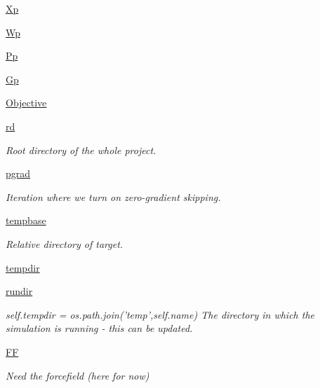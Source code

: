 \begin{DoxyCompactItemize}
\hyperlink{classforcebalance_1_1lipid_1_1Lipid_a56ebab6f8e310afff1b15786ac819eec}{Xp}
\item 
\hyperlink{classforcebalance_1_1lipid_1_1Lipid_aede087654d9ef2447e82692e1b2c65db}{Wp}
\item 
\hyperlink{classforcebalance_1_1lipid_1_1Lipid_aca96d65234d1e76d1fd601579025fe55}{Pp}
\item 
\hyperlink{classforcebalance_1_1lipid_1_1Lipid_a1fd3411f9d69e50655ac9d2b8de9fc2b}{Gp}
\item 
\hyperlink{classforcebalance_1_1lipid_1_1Lipid_a0ffb4377a0cfdf7572166bb6e8d5b130}{Objective}
\item 
\hyperlink{classforcebalance_1_1target_1_1Target_a4edb69fbde792e9f2f27e54b7c978c8e}{rd}
\begin{DoxyCompactList}\small\item\em Root directory of the whole project. \end{DoxyCompactList}\item 
\hyperlink{classforcebalance_1_1target_1_1Target_a684235b4332b608c4e2da22982c2fdfa}{pgrad}
\begin{DoxyCompactList}\small\item\em Iteration where we turn on zero-\/gradient skipping. \end{DoxyCompactList}\item 
\hyperlink{classforcebalance_1_1target_1_1Target_ae5b544d3e11365865813ef3d626ef81d}{tempbase}
\begin{DoxyCompactList}\small\item\em Relative directory of target. \end{DoxyCompactList}\item 
\hyperlink{classforcebalance_1_1target_1_1Target_aa1f01b5b78db253b5b66384ed11ed193}{tempdir}
\item 
\hyperlink{classforcebalance_1_1target_1_1Target_a6872de5b2d4273b82336ea5b0da29c9e}{rundir}
\begin{DoxyCompactList}\small\item\em self.\-tempdir = os.\-path.\-join('temp',self.\-name) The directory in which the simulation is running -\/ this can be updated. \end{DoxyCompactList}\item 
\hyperlink{classforcebalance_1_1target_1_1Target_a38a37919783141ea37fdcf8b00ce0aaf}{F\-F}
\begin{DoxyCompactList}\small\item\em Need the forcefield (here for now) \end{DoxyCompactList}\item 

\end{DoxyCompactItemize}
